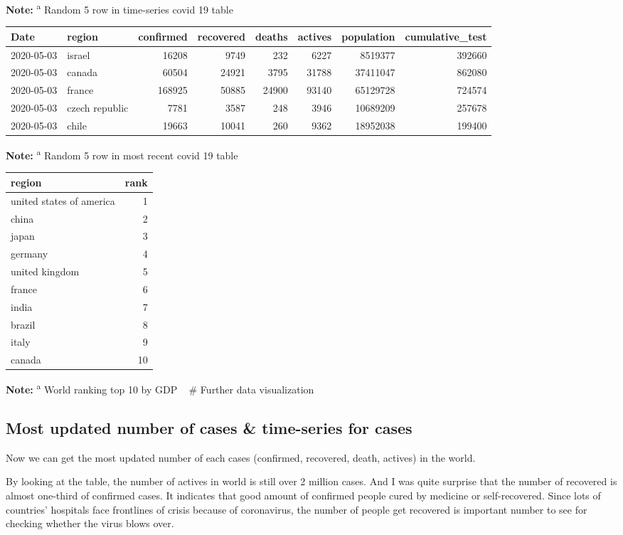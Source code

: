 \documentclass[
  11pt,
]{article}
\begin{document}
\textbf{Note:} \textsuperscript{a} Random 5 row in time-series covid 19
table

\begin{longtable}[]{@{}llrrrrrr@{}}
\toprule
Date & region & confirmed & recovered & deaths & actives & population &
cumulative\_test\tabularnewline
\midrule
\endhead
2020-05-03 & israel & 16208 & 9749 & 232 & 6227 & 8519377 &
392660\tabularnewline
2020-05-03 & canada & 60504 & 24921 & 3795 & 31788 & 37411047 &
862080\tabularnewline
2020-05-03 & france & 168925 & 50885 & 24900 & 93140 & 65129728 &
724574\tabularnewline
2020-05-03 & czech republic & 7781 & 3587 & 248 & 3946 & 10689209 &
257678\tabularnewline
2020-05-03 & chile & 19663 & 10041 & 260 & 9362 & 18952038 &
199400\tabularnewline
\bottomrule
\end{longtable}

\textbf{Note:} \textsuperscript{a} Random 5 row in most recent covid 19
table

\begin{longtable}[]{@{}lr@{}}
\toprule
region & rank\tabularnewline
\midrule
\endhead
united states of america & 1\tabularnewline
china & 2\tabularnewline
japan & 3\tabularnewline
germany & 4\tabularnewline
united kingdom & 5\tabularnewline
france & 6\tabularnewline
india & 7\tabularnewline
brazil & 8\tabularnewline
italy & 9\tabularnewline
canada & 10\tabularnewline
\bottomrule
\end{longtable}

\textbf{Note:} \textsuperscript{a} World ranking top 10 by GDP ~ \#
Further data visualization

\hypertarget{most-updated-number-of-cases-time-series-for-cases}{%
\subsection{Most updated number of cases \& time-series for
cases}\label{most-updated-number-of-cases-time-series-for-cases}}

Now we can get the most updated number of each cases (confirmed,
recovered, death, actives) in the world.

By looking at the table, the number of actives in world is still over 2
million cases. And I was quite surprise that the number of recovered is
almost one-third of confirmed cases. It indicates that good amount of
confirmed people cured by medicine or self-recovered. Since lots of
countries' hospitals face frontlines of crisis because of coronavirus,
the number of people get recovered is important number to see for
checking whether the virus blows over.
\end{document}
